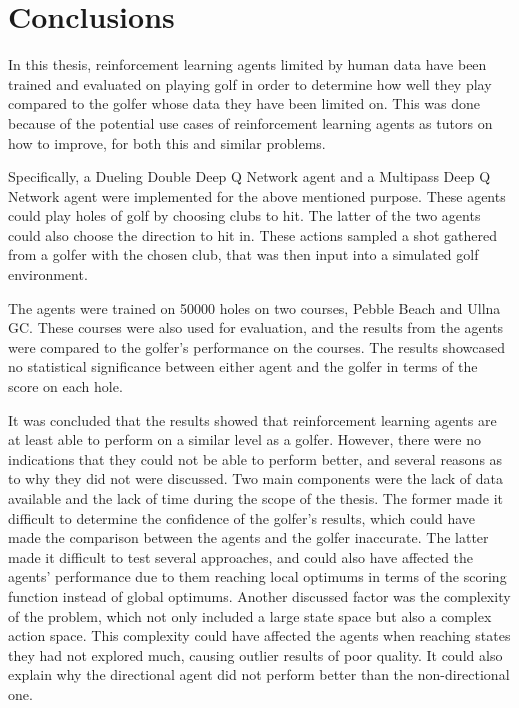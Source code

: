 \documentclass{kththesis}
\begin{document}
\chapter{Conclusions}
\label{chapter:conclusions}
In this thesis, reinforcement learning agents limited by human data have been trained and evaluated on playing golf in order to determine how well they play compared to the golfer whose data they have been limited on. This was done because of the potential use cases of reinforcement learning agents as tutors on how to improve, for both this and similar problems.

Specifically, a Dueling Double Deep Q Network agent and a Multipass Deep Q Network agent were implemented for the above mentioned purpose. These agents could play holes of golf by choosing clubs to hit. The latter of the two agents could also choose the direction to hit in. These actions sampled a shot gathered from a golfer with the chosen club, that was then input into a simulated golf environment. 

The agents were trained on 50000 holes on two courses, Pebble Beach and Ullna GC. These courses were also used for evaluation, and the results from the agents were compared to the golfer's performance on the courses. The results showcased no statistical significance between either agent and the golfer in terms of the score on each hole.

It was concluded that the results showed that reinforcement learning agents are at least able to perform on a similar level as a golfer. However, there were no indications that they could not be able to perform better, and several reasons as to why they did not were discussed. Two main components were the lack of data available and the lack of time during the scope of the thesis. The former made it difficult to determine the confidence of the golfer's results, which could have made the comparison between the agents and the golfer inaccurate. The latter made it difficult to test several approaches, and could also have affected the agents' performance due to them reaching local optimums in terms of the scoring function instead of global optimums. Another discussed factor was the complexity of the problem, which not only included a large state space but also a complex action space. This complexity could have affected the agents when reaching states they had not explored much, causing outlier results of poor quality. It could also explain why the directional agent did not perform better than the non-directional one.
\end{document}
